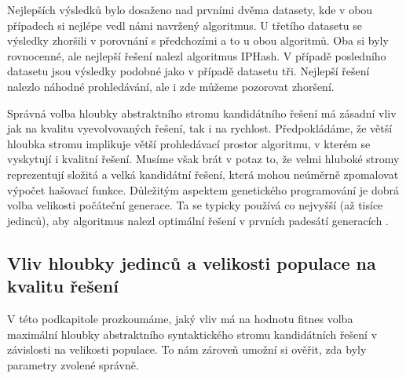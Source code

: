 Nejlepších výsledků bylo dosaženo nad prvními dvěma datasety, kde v obou případech si nejlépe vedl námi navržený
algoritmus. U třetího datasetu se výsledky zhoršili v porovnání s předchozími a to u obou algoritmů. Oba si byly 
rovnocenné, ale nejlepší řešení nalezl algoritmus IPHash. V případě posledního datasetu jsou výsledky podobné jako
v případě datasetu tři. Nejlepší řešení nalezlo náhodné prohledávání, ale i zde můžeme pozorovat zhoršení. 

Správná volba hloubky abstraktního stromu kandidátního řešení má zásadní vliv jak na kvalitu vyevolvovaných řešení,
tak i na rychlost. Předpokládáme, že větší hloubka stromu implikuje větší prohledávací prostor algoritmu, v kterém
se vyskytují i kvalitní řešení. Musíme však brát v potaz to, že velmi hluboké stromy reprezentují složitá a velká kandidátní
řešení, která mohou neúměrně zpomalovat výpočet hašovací funkce. Důležitým aspektem genetického programování je 
dobrá volba velikosti počáteční generace. Ta se typicky používá co nejvyšší (až tisíce jedinců), aby algoritmus nalezl
optimální řešení v prvních padesátí generacích \cite{GPTutorial}.


\subsection{Vliv hloubky jedinců a velikosti populace na kvalitu řešení}
V této podkapitole prozkoumáme, jaký vliv má na hodnotu fitnes volba maximální hloubky abstraktního syntaktického
stromu kandidátních řešení v závislosti na velikosti populace. To nám zároveň umožní si ověřit, zda byly parametry zvolené
správně.

